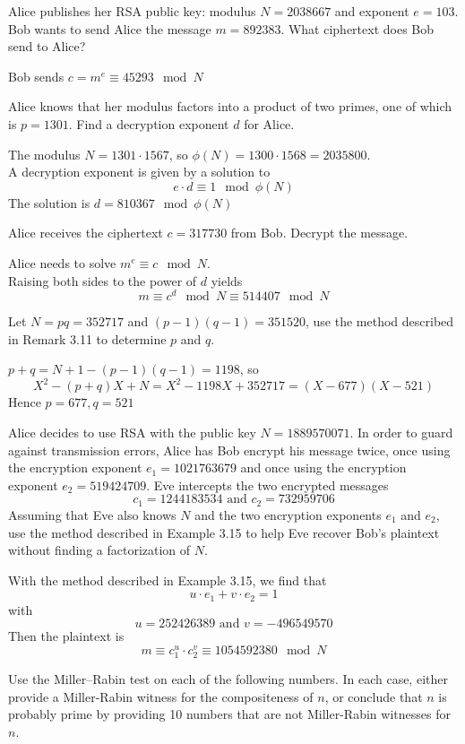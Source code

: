 \documentclass[12pt]{article}
\begin{document}
\thispagestyle{empty}

\problem Alice publishes her RSA public key: modulus $N=2038667$ and exponent $e=103$.\\
\subproblem Bob wants to send Alice the message $m=892383$. What ciphertext does Bob send to Alice?

\solution
Bob sends $c=m^e\equiv45293\mod{N}$

\subproblem Alice knows that her modulus factors into a product of two primes, one of which is $p=1301$. Find a decryption exponent $d$ for Alice.

\solution
The modulus $N=1301\cdot1567$, so $\phi(N)=1300\cdot1568=2035800$.\\
A decryption exponent is given by a solution to
\[e\cdot d\equiv 1\mod{\phi(N)}\]
The solution is $d=810367\mod{\phi(N)}$

\subproblem Alice receives the ciphertext $c=317730$ from Bob. Decrypt the message.

\solution
Alice needs to solve $m^e\equiv c\mod{N}$.\\
Raising both sides to the power of $d$ yields
\[m\equiv c^{d}\mod{N}\equiv 514407\mod{N}\]

\newpage
\problem Let $N=pq=352717$ and $(p-1)(q-1)=351520$, use the method described in Remark 3.11 to determine $p$ and $q$.

\solution
$p+q=N+1-(p-1)(q-1)=1198$, so
\[X^2-(p+q)X+N=X^2-1198X+352717=(X-677)(X-521)\]
Hence $p=677,q=521$

\problem Alice decides to use RSA with the public key $N=1889570071$. In order to guard against transmission errors, Alice has Bob encrypt his message twice, once using the encryption exponent $e_1= 1021763679$ and once using the encryption exponent $e_2=519424709$. Eve intercepts the two encrypted messages
\[c_1=1244183534 \text{ and } c_2=732959706\]
Assuming that Eve also knows $N$ and the two encryption exponents $e_1$ and $e_2$, use the method described in Example 3.15 to help Eve recover Bob’s plaintext without finding a factorization of $N$.

\solution
With the method described in Example 3.15, we find that
\[u\cdot e_1+v\cdot e_2=1\]
with
\[u= 252426389 \text{ and } v=-496549570\]
Then the plaintext is
\[m\equiv c_1^{u}\cdot c_2^{v}\equiv 1054592380\mod{N}\]

\newpage
\problem Use the Miller–Rabin test on each of the following numbers. In each case, either provide a Miller-Rabin witness for the compositeness of $n$, or conclude that $n$ is probably prime by providing 10 numbers that are not Miller-Rabin witnesses for $n$.
\end{document}

